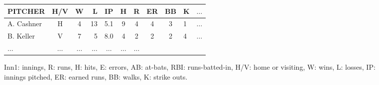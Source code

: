 \documentclass[11pt,a4paper]{article}
\newcommand{\lform}[1]{\textsf{\scriptsize{#1}}}
\begin{document}
\begin{figure*}
\begin{small}
\begin{minipage}{0.4\textwidth}
\vspace{.3cm}
\begin{tabular}{@{}l@{~~}c@{~~}c@{~}r@{~~}c@{~~}c@{~~}c@{~~}c@{~~}c@{~~}l@{~~}l@{}} \hline
\lform{PITCHER} & \lform{H/V} & \lform{W} & \lform{L} & \lform{IP}& \lform{H} &  \lform{R} &  \lform{ER}&  \lform{BB}&  \lform{K} & \lform{$\dots$}\\ \hline
\lform{A. Cashner} & \lform{H} & \lform{4} & \lform{13} & \lform{5.1}& \lform{9} &   \lform{4}&   \lform{4} &   \lform{3}&   \lform{1}& \lform{$\dots$}\\
\lform{B. Keller} & \lform{V}& \lform{7} & \lform{5} & \lform{8.0} & \lform{4}&  \lform{2}  &   \lform{2}&   \lform{2}&   \lform{4} & \lform{$\dots$}\\
\lform{$\dots$} & \lform{$\dots$} & \lform{$\dots$} & \lform{$\dots$} &  \lform{$\dots$} &  \lform{$\dots$} & \lform{$\dots$}\\\hline
\end{tabular}


\vspace{.3cm}                        

\lform{Inn1:} innings, \lform{R:} runs, \lform{H:}  hits, \lform{E:}  errors,
 \lform{AB:} at-bats, \lform{RBI:} runs-batted-in, \lform{H/V:} home or visiting,
  \lform{W:} wins, \lform{L:} losses,  \lform{IP:} innings pitched, \lform{ER:} earned runs,
  \lform{BB:} walks, \lform{K:} strike outs.

\end{minipage}
\begin{minipage}{0.5\textwidth}
\vspace*{-.4cm}

\hspace*{-1.3cm}\begin{tabular}{p{9cm}} \hline 
  

\end{tabular}
\end{minipage}
\end{small}
\end{figure*}
\end{document}
